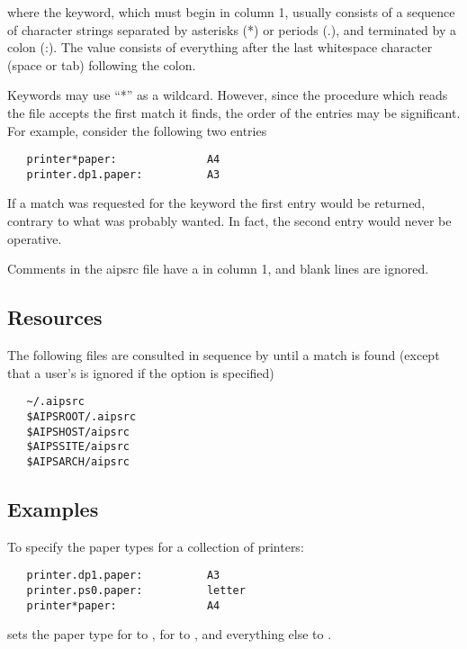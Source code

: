 \noindent
where the keyword, which must begin in column 1, usually consists of a
sequence of character strings separated by asterisks (*) or periods (.), and
terminated by a colon (:).  The value consists of everything after the last
whitespace character (space or tab) following the colon.

Keywords may use ``*'' as a wildcard.  However, since the procedure which
reads the  file accepts the first match it finds, the order of
the entries may be significant.  For example, consider the following two
 entries

\begin{verbatim}
   printer*paper:              A4
   printer.dp1.paper:          A3
\end{verbatim}

\noindent
If a match was requested for the keyword  the first
entry would be returned, contrary to what was probably wanted.  In fact, the
second entry would never be operative.

Comments in the aipsrc file have a \code{\#} in column 1, and blank lines are
ignored.

\subsection*{Resources}

The following  files are consulted in sequence by 
until a match is found (except that a user's  is ignored if
the  option is specified)

\begin{verbatim}
   ~/.aipsrc
   $AIPSROOT/.aipsrc
   $AIPSHOST/aipsrc
   $AIPSSITE/aipsrc
   $AIPSARCH/aipsrc
\end{verbatim}

\subsection*{Examples}

To specify the paper types for a collection of printers:

\begin{verbatim}
   printer.dp1.paper:          A3
   printer.ps0.paper:          letter
   printer*paper:              A4
\end{verbatim}

\noindent
sets the paper type for  to , for  to
, and everything else to .

